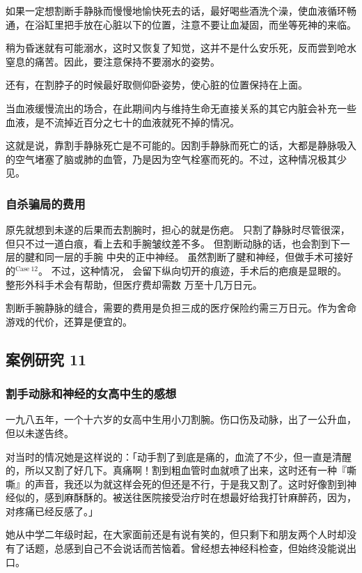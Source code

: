 \documentclass[UTF8]{ctexart}
\begin{document}
如果一定想割断手静脉而慢慢地愉快死去的话，最好喝些酒洗个澡，使血液循环畅通，在浴缸里把手放在心脏以下的位置，注意不要让血凝固，而坐等死神的来临。

稍为昏迷就有可能溺水，这时又恢复了知觉，这并不是什么安乐死，反而尝到呛水窒息的痛苦。因此，要注意保持不要溺水的姿势。

还有，在割脖子的时候最好取侧仰卧姿势，使心脏的位置保持在上面。

当血液缓慢流出的场合，在此期间内与维持生命无直接关系的其它内脏会补充一些血液，是不流掉近百分之七十的血液就死不掉的情况。

这就是说，靠割手静脉死亡是不可能的。因割手静脉而死亡的话，大都是静脉吸入的空气堵塞了脑或肺的血管，乃是因为空气栓塞而死的。不过，这种情况极其少见。

\subsubsection*{自杀骗局的费用}

原先就想到未遂的后果而去割腕时，担心的就是伤疤。
只割了静脉时尽管很深，但只不过一道白痕，看上去和手腕皱纹差不多。
但割断动脉的话，也会割到下一层的腱和同一层的手腕 中央的正中神经。
虽然割断了腱和神经，但做手术可接好的$^{\mathrm{Case\ 12}}$。
不过，这种情况， 会留下纵向切开的痕迹，手术后的疤痕是显眼的。
整形外科手术会有帮助，但医疗费却需数 万至十几万日元。

割断手腕静脉的缝合，需要的费用是负担三成的医疗保险约需三万日元。作为舍命游戏的代价，还算是便宜的。

\subsection{案例研究 11}
\subsubsection*{割手动脉和神经的女高中生的感想}

一九八五年，一个十六岁的女高中生用小刀割腕。伤口伤及动脉，出了一公升血，但以未遂告终。

对当时的情况她是这样说的：「动手割了到底是痛的，血流了不少，但一直是清醒的，所以又割了好几下。真痛啊！割到粗血管时血就喷了出来，这时还有一种『嘶嘶』的声音，我还以为就这样会死的但还是不行，于是我又割了。这时好像割到神经似的，感到麻酥酥的。被送往医院接受治疗时在想最好给我打针麻醉药，因为，对疼痛已经反感了。」

她从中学二年级时起，在大家面前还是有说有笑的，但只剩下和朋友两个人时却没有了话题，总感到自己不会说话而苦恼着。曾经想去神经科检查，但始终没能说出口。
\end{document}
